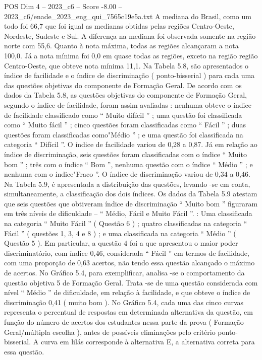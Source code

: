 \begin{textsample}{POS Dim 4 – 2023\_c6 – Score -8.00 – 2023\_c6/enade\_2023\_eng\_qui\_7565c19e5a.txt}
A mediana do Brasil, como um todo foi 66,7 que foi igual as medianas obtidas pelas regiões Centro-Oeste, Nordeste, Sudeste e Sul.
A diferença na mediana foi observada somente na região norte com 55,6.
Quanto à nota máxima, todas as regiões alcançaram a nota 100,0.
Já a nota mínima foi 0,0 em quase todas as regiões, exceto na região região Centro-Oeste, que obteve nota mínima 11,1.
Na Tabela 5.8, são apresentados o índice de facilidade e o índice de discriminação ( ponto-bisserial ) para cada uma das questões objetivas do componente de Formação Geral.
De acordo com os dados da Tabela 5.8, as questões objetivas do componente de Formação Geral, segundo o índice de facilidade, foram assim avaliadas : nenhuma obteve o índice de facilidade classificado como “ Muito difícil ” ; uma questão foi classificada como “ Muito fácil ” ; cinco questões foram classificadas como “ Fácil ” ; duas questões foram classificadas como"Médio ” ; e uma questão foi classificada na categoria “ Difícil ”.
O índice de facilidade variou de 0,28 a 0,87.
Já em relação ao índice de discriminação, seis questões foram classificadas com o índice “ Muito bom ” ; três com o índice “ Bom ”, nenhuma questão com o índice “ Médio ” ; e nenhuma com o índice"Fraco ”.
O índice de discriminação variou de 0,34 a 0,46.
Na Tabela 5.9, é apresentada a distribuição das questões, levando -se em conta, simultaneamente, a classificação dos dois índices.
Os dados da Tabela 5.9 atestam que seis questões que obtiveram índice de discriminação “ Muito bom ” figuraram em três níveis de dificuldade – “ Médio, Fácil e Muito Fácil ”. : Uma classificada na categoria “ Muito Fácil ” ( Questão 6 ) ; quatro classificadas na categoria “ Fácil ” ( questões 1, 3, 4 e 8 ) ; e uma classificada na categoria “ Médio ” ( Questão 5 ).
Em particular, a questão 4 foi a que apresentou o maior poder discriminatório, com índice 0,46, considerada “ Fácil ” em termos de facilidade, com uma proporção de 0,63 acertos, não tendo essa questão alcançado o máximo de acertos.
No Gráfico 5.4, para exemplificar, analisa -se o comportamento da questão objetiva 5 de Formação Geral.
Trata -se de uma questão considerada com nível “ Médio ” de dificuldade, em relação à facilidade, e que obteve o índice de discriminação 0,41 ( muito bom ).
No Gráfico 5.4, cada uma das cinco curvas representa o percentual de respostas em determinada alternativa da questão, em função do número de acertos dos estudantes nessa parte da prova ( Formação Geral/múltipla escolha ), antes de possíveis eliminações pelo critério ponto-bisserial.
A curva em lilás corresponde à alternativa E, a alternativa correta para essa questão.

\end{textsample}
